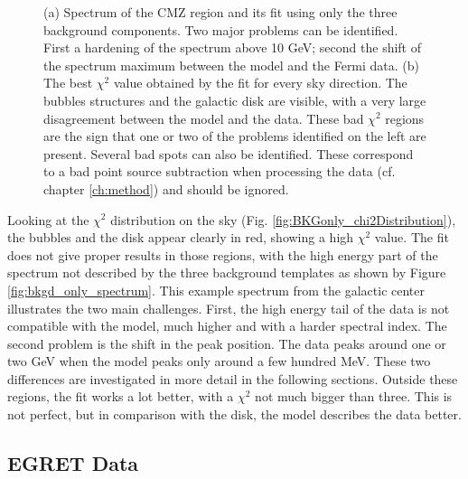 \begin{figure}[h]
\begin{minipage}[h]{0.45\textwidth}
	  \subcaption{}
	  \label{fig:BKGonly_chi2Distribution}
  \end{minipage}
  \caption{(a) Spectrum of the CMZ region and its fit using only the three background components. Two major problems can be identified. First a hardening of the spectrum above 10 GeV; second the shift of the spectrum maximum between the model and the Fermi data. (b) The best $\chi^2$ value obtained by the fit for every sky direction. The bubbles structures and the galactic disk are visible, with a very large disagreement between the model and the data. These bad $\chi^2$ regions are the sign that one or two of the problems identified on the left are present. Several bad spots can also be identified. These correspond to a bad point source subtraction when processing the data (cf. chapter \ref{ch:method}) and should be ignored.}
  \label{}
\end{figure}


Looking at the $\chi^2$ distribution on the sky (Fig. \ref{fig:BKGonly_chi2Distribution}), the bubbles and the disk appear clearly in red, showing a high $\chi^2$ value. The fit does not give proper results in those regions, with the high energy part of the spectrum not described by the three background templates as shown by Figure \ref{fig:bkgd_only_spectrum}. This example spectrum from the galactic center illustrates the two main challenges. First, the high energy tail of the data is not compatible with the model, much higher and with a harder spectral index. The second problem is the shift in the peak position. The data peaks around one or two GeV when the model peaks only around a few hundred MeV. These two differences are investigated in more detail in the following sections.
Outside these regions, the fit works a lot better, with a $\chi^2$ not much bigger than three. This is not perfect, but in comparison with the disk, the model describes the data better.



\subsection{EGRET Data}


